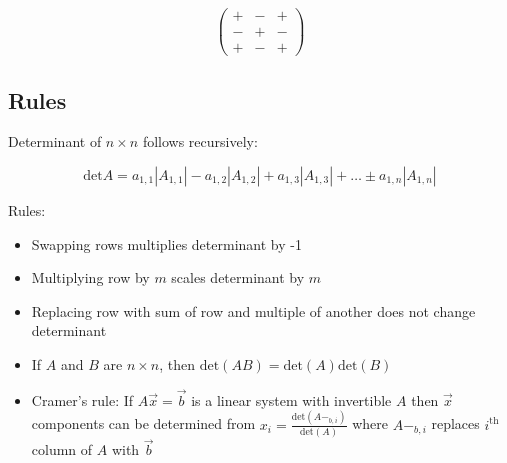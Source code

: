 \[\begin{pmatrix}+&-&+\\-&+&-\\+&-&+\end{pmatrix}\]

\subsection{Rules}

Determinant of $n\times n$ follows recursively:

\[\boxed{\mbox{det}A=a_{1,1}\left|A_{1,1}\right|-a_{1,2}\left|A_{1,2}\right|+a_{1,3}\left|A_{1,3}\right|+\dots\pm a_{1,n}\left|A_{1,n}\right|}\]

\noindent
Rules:
\begin{itemize}
    \item Swapping rows multiplies determinant by -1
    \item Multiplying row by $m$ scales determinant by $m$
    \item Replacing row with sum of row and multiple of another does not change determinant
    \item If $A$ and $B$ are $n\times n$, then $\mathrm{det}(AB)=\mathrm{det}(A)\mathrm{det}(B)$
    \item Cramer's rule: If $A\vec{x}=\vec{b}$ is a linear system with invertible $A$ then $\vec{x}$ components can be determined
    from $x_i=\frac{\mathrm{det}(A-_{b,i})}{\mathrm{det}(A)}$ where $A-_{b,i}$ replaces $i^{\mathrm{th}}$ column of $A$ with $\vec{b}$
\end{itemize}